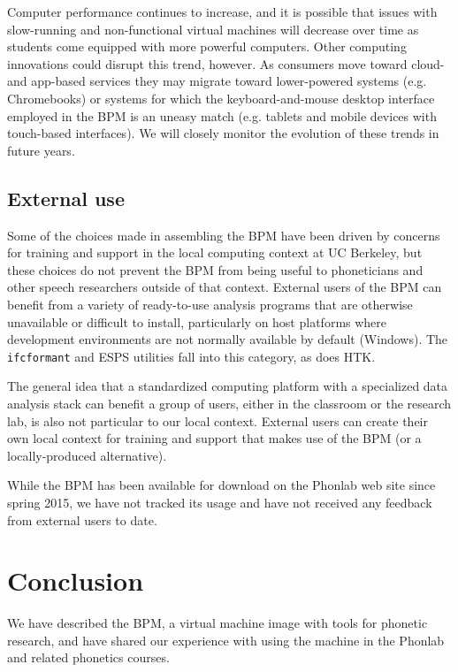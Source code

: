 \documentclass[a4paper]{article}
\begin{document}
    Computer performance continues to increase, and it is possible that issues with slow-running and non-functional virtual machines will decrease over time as students come equipped with more powerful computers. Other computing innovations could disrupt this trend, however. As consumers move toward cloud- and app-based services they may migrate toward lower-powered systems (e.g. Chromebooks) or systems for which the keyboard-and-mouse desktop interface employed in the BPM is an uneasy match (e.g. tablets and mobile devices with touch-based interfaces). We will closely monitor the evolution of these trends in future years.

    \subsection{External use}
    Some of the choices made in assembling the BPM have been driven by concerns for training and support in the local computing context at UC Berkeley, but these choices do not prevent the BPM from being useful to phoneticians and other speech researchers outside of that context. External users of the BPM can benefit from a variety of ready-to-use analysis programs that are otherwise unavailable or difficult to install, particularly on host platforms where development environments are not normally available by default (Windows). The {\tt ifcformant} and ESPS utilities fall into this category, as does HTK.

    The general idea that a standardized computing platform with a specialized data analysis stack can benefit a group of users, either in the classroom or the research lab, is also not particular to our local context. External users can create their own local context for training and support that makes use of the BPM (or a locally-produced alternative).

    While the BPM has been available for download on the Phonlab web site \cite{bpm-wiki} since spring 2015, we have not tracked its usage and have not received any feedback from external users to date.

  \section{Conclusion}
  We have described the BPM, a virtual machine image with tools for phonetic research, and have shared our experience with using the machine in the Phonlab and related phonetics courses.

  \newpage
  \eightpt
  
\end{document}
